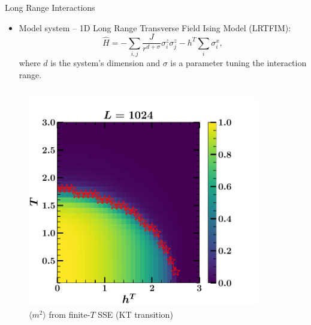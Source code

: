 \documentclass[final,hyperref={pdfpagelabels=false}]{beamer}
\begin{document}
\begin{frame}[t]
\begin{columns}[t]
\begin{column}{.48\textwidth}
\begin{block}{Long Range Interactions}
\begin{itemize}
\item Model system -- 1D Long Range Transverse Field Ising Model (LRTFIM):
\begin{equation}
\hat{H} = -\sum_{i, j} \frac{J}{r^{d + \sigma}} \sigma_{i}^{z} \sigma_{j}^{z} - h^T \sum_{i} \sigma_{i}^{x},  \label{eq:Hamilotnian_TFIM} 
\end{equation}
where $d$ is the system's dimension and $\sigma$ is a parameter tuning the interaction range.
\end{itemize}
\begin{columns}[T,onlytextwidth]
\begin{figure}[H]
\centering
\includegraphics[width=0.9\textwidth]{2023-tiwari-espresso-summer-school-poster-session-pimd-main/figures/dyson_moel_sigma_1_transverse_field_phase_transitions.pdf}
\caption{$\langle m^2 \rangle$ from finite-$T$ SSE (KT transition)}
\end{figure}


\end{columns}
\end{block}
\end{column}
\end{columns}
\end{frame}
\end{document}
